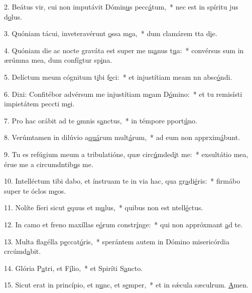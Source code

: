 2. Beátus vir, cui non imputávit Dómin\uline{u}s pecc\uline{á}tum,~* nec est in spíritu jus d\uline{o}lus.\par 
3. Quóniam tácui, inveteravérunt \uline{o}ssa m\uline{e}a,~* dum clamárem tta d\uline{i}e.\par 
4. Quóniam die ac nocte graváta est super me m\uline{a}nus t\uline{u}a:~* convérsus sum in ærúmna mea, dum confígtur sp\uline{i}na.\par 
5. Delíctum meum cógnitum t\uline{i}bi f\uline{e}ci:~* et injustítiam meam nn absc\uline{ó}ndi.\par 
6. Dixi: Confitébor advérsum me injustítiam m\uline{e}am D\uline{ó}mino:~* et tu remisísti impietátem peccti m\uline{e}i.\par 
7. Pro hac orábit ad te \uline{o}mnis s\uline{a}nctus,~* in témpore pport\uline{ú}no.\par 
8. Verúmtamen in dilúvio a\uline{quá}rum mult\uline{á}rum,~* ad eum non apprxim\uline{á}bunt.\par 
9. Tu es refúgium meum a tribulatióne, quæ circ\uline{ú}mded\uline{i}t me:~* exsultátio mea, érue me a circumdntib\uline{u}s me.\par 
10. Intelléctum tibi dabo, et ínstruam te in via hac, qua gr\uline{a}di\uline{é}ris:~* firmábo super te óclos m\uline{e}os.\par 
11. Nolíte fíeri sicut \uline{e}quus et m\uline{u}lus,~* quibus non est ntell\uline{é}ctus.\par 
12. In camo et freno maxíllas e\uline{ó}rum constr\uline{í}nge:~* qui non appróxmant \uline{a}d te.\par 
13. Multa flagélla p\uline{e}ccat\uline{ó}ris,~* sperántem autem in Dómino misericórdia crcúmd\uline{a}bit.\par 
14. Glória P\uline{a}tri, et F\uline{í}lio,~* et Spiríti S\uline{a}ncto.\par 
15. Sicut erat in princípio, et n\uline{u}nc, et s\uline{e}mper,~* et in sǽcula sæculrum. \uline{A}men.\par 
